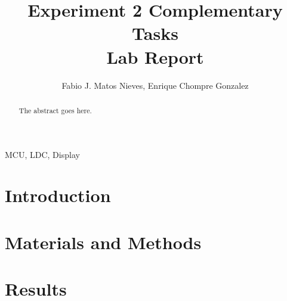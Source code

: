\documentclass[journal]{IEEEtran}
\begin{document}
\title{Experiment 2 Complementary Tasks\\ Lab Report}
\author{Fabio J. Matos Nieves, Enrique Chompre Gonzalez}
\maketitle
\begin{abstract}
The abstract goes here.
\end{abstract}
\begin{IEEEkeywords}
MCU, LDC, Display
\end{IEEEkeywords}
\IEEEpeerreviewmaketitle
\section{Introduction}

\section{Materials and Methods}

\section{Results}
\appendices
{}
\end{document}
